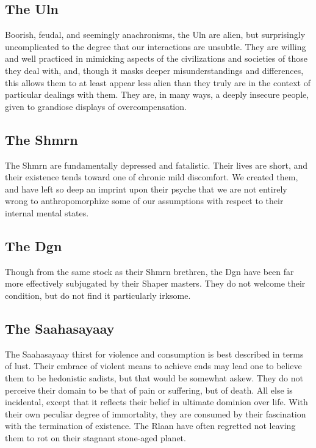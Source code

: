 \subsection{The Uln}

Boorish, feudal, and seemingly anachronisms, the Uln are alien, but
surprisingly uncomplicated to the degree that our interactions are
unsubtle. They are willing and well practiced in mimicking aspects of
the civilizations and societies of those they deal with, and, though
it masks deeper misunderstandings and differences, this allows them to
at least appear less alien than they truly are in the context of
particular dealings with them. They are, in many ways, a deeply
insecure people, given to grandiose displays of overcompensation.

\subsection{The Shmrn}

The Shmrn are fundamentally depressed and fatalistic. Their lives are
short, and their existence tends toward one of chronic mild
discomfort. We created them, and have left so deep an imprint upon
their psyche that we are not entirely wrong to anthropomorphize some
of our assumptions with respect to their internal mental states.

\subsection{The Dgn}

Though from the same stock as their Shmrn brethren, the Dgn have been
far more effectively subjugated by their Shaper masters. They do not
welcome their condition, but do not find it particularly irksome.

\subsection{The Saahasayaay}

The Saahasayaay thirst for violence and consumption is best described
in terms of lust. Their embrace of violent means to achieve ends may
lead one to believe them to be hedonistic sadists, but that would be
somewhat askew. They do not perceive their domain to be that of pain
or suffering, but of death. All else is incidental, except that it
reflects their belief in ultimate dominion over life. With their own
peculiar degree of immortality, they are consumed by their fascination
with the termination of existence. The Rlaan have often regretted not
leaving them to rot on their stagnant stone-aged planet.

